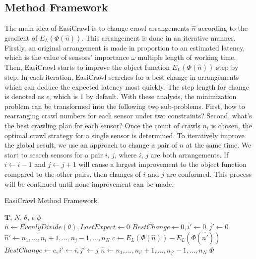 \documentclass[conference]{IEEEtran}
\begin{document}
\subsection{Method Framework}
The main idea of EasiCrawl is to change crawl arrangements $\hat{n}$ according to the gradient of $E_L(\Phi(\hat{n}))$.
This arrangement is done in an iterative manner.
Firstly, an original arrangement is made in proportion to an estimated latency, which is the value of sensors' importance $\omega$ multiple length of working time.
Then, EasiCrawl starts to improve the object function $E_L(\Phi(\hat{n}))$ step by step. 
In each iteration, EasiCrawl searches for a best change in arrangements which can deduce the expected latency most quickly.
The step length for change is denoted as $\epsilon$, which is $1$ by default.
With these analysis, the minimization problem can be transformed into the following two sub-problems.
First, how to rearranging crawl numbers for each sensor under two constraints? 
Second, what's the best crawling plan for each sensor? 
Once the count of crawls $n_i$ is chosen, the optimal crawl strategy for a single sensor is determined. 
To iteratively improve the global result, we use an approach to change a pair of $n$ at the same time.
We start to search sensors for a pair $i$, $j$, where $i$, $j$ are both arrangements. 
If $i\gets i-1$ and $j\gets j+1$ will cause a largest improvement to the object function compared to the other pairs, then changes of $i$ and $j$ are conformed. 
This process will be continued until none improvement can be made. 

\begin{algorithm}
	\caption{EasiCrawl Method Framework}
	\label{alg:framework}
	\begin{algorithmic}[1]
		\renewcommand{\algorithmicrequire}{\textbf{Input:}}
		\renewcommand{\algorithmicensure}{\textbf{Output:}}
		\REQUIRE $\mathbf{T}$, $N$, $\theta$, $\epsilon$
		\ENSURE  $\phi$
		\\ 
		\STATE $\hat{n}\gets EvenlyDivide(\theta), LastExpect\gets 0$
		\STATE $BestChange \gets 0, i'\gets 0, j'\gets 0$		
		\STATE $\hat{n}'\gets n_1,...,n_i+1,...,n_j-1,...,n_N$
		\STATE $c\gets E_L(\Phi(\hat{n})) - E_L(\Phi(\hat{n'}))$
		\STATE $BestChange \gets c, i'\gets i, j'\gets j$
		\ENDIF
		\ENDFOR
		\STATE $\hat{n}\gets n_1,...,n_{i'}+1,...,n_{j'}-1,...,n_N$
		\ENDWHILE 
		\RETURN $\Phi$
	\end{algorithmic} 
\end{algorithm}
\end{document}

